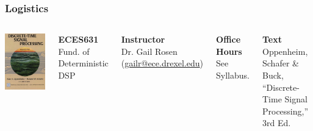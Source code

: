 \documentclass[mathserif,9pt,handout]{beamer}
\begin{document}
\begin{frame}\frametitle{Logistics}\small
  \begin{columns}
      \begin{center}\includegraphics[width=.8\textwidth]{dtsp.jpg}\end{center}
    {\bf\color{blue!50!black}ECES631} \\
    Fund. of Deterministic DSP \\
    \vspace{1em}
    
    {\bf\color{blue!50!black}Instructor} \\
    Dr. Gail Rosen ({\color{blue}\url{gailr@ece.drexel.edu}}) \\
    \vspace{1em}
    
    {\bf\color{blue!50!black}Office Hours} \\
    See Syllabus. \\
    \vspace{1em}

    
    {\bf\color{blue!50!black}Text} \\
    Oppenheim, Schafer \& Buck, ``Discrete-Time Signal Processing,'' 3rd Ed.
    \vspace{1em}
    

\end{columns}
\end{frame}
\end{document}
